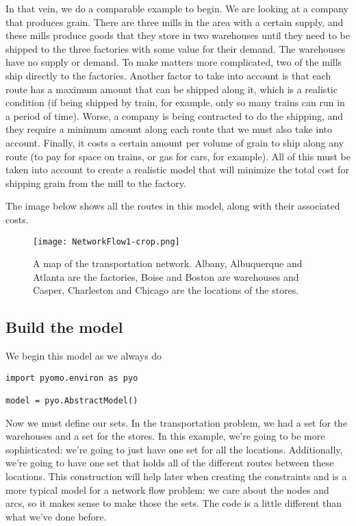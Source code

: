 \documentclass{article}
\begin{document}
In that vein, we do a comparable example to begin.  We are looking at a company that produces grain.  There are three mills in the area with a certain supply, and these mills produce goods that they store in two warehouses until they need to be shipped to the three factories with some value for their demand.  The warehouses have no supply or demand.  To make matters more complicated, two of the mills ship directly to the factories.  Another factor to take into account is that each route has a maximum amount that can be shipped along it, which is a realistic condition (if being shipped by train, for example, only so many trains can run in a period of time).  Worse, a company is being contracted to do the shipping, and they require a minimum amount along each route that we must also take into account.  Finally, it costs a certain amount per volume of grain to ship along any route (to pay for space on trains, or gas for cars, for example).  All of this must be taken into account to create a realistic model that will minimize the total cost for shipping grain from the mill to the factory.

The image below shows all the routes in this model, along with their associated costs.

\begin{figure}
\begin{center}
 \texttt{[image: NetworkFlow1-crop.png]}
\end{center}
\caption{A map of the transportation network.  Albany, Albuquerque and Atlanta are the factories, Boise and Boston are warehouses and Casper, Charleston and Chicago are the locations of the stores.}
\end{figure} 

\subsection*{Build the model}

We begin this model as we always do

\begin{verbatim}
import pyomo.environ as pyo

model = pyo.AbstractModel()
\end{verbatim}

Now we must define our sets.  In the transportation problem, we had a set for the warehouses and a set for the stores.  In this example, we're going to be more sophisticated: we're going to just have one set for all the locations.  Additionally, we're going to have one set that holds all of the different routes between these locations.  This construction will help later when creating the constraints and is a more typical model for a network flow problem: we care about the nodes and arcs, so it makes sense to make those the sets.  The code is a little different than what we've done before.
\end{document}
